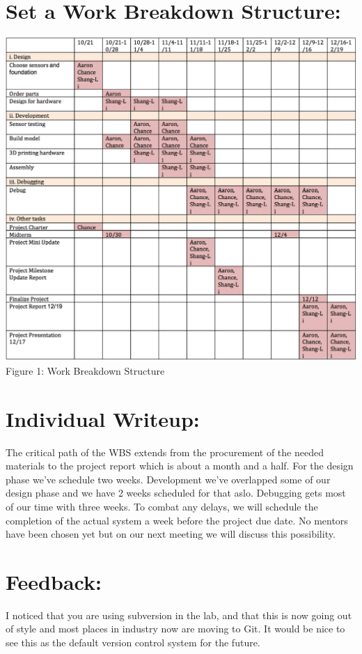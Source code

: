 \documentclass[twoside]{article}
\begin{document}
\section{Set a Work Breakdown Structure:}
\begin{center}
\includegraphics*[width = 19cm]{Fig2.png}\\
Figure 1: Work Breakdown Structure
\end{center}

\section{Individual Writeup:}

The critical path of the WBS extends from the procurement of the needed materials to the project report which is about a month and a half. For the design phase we've schedule two weeks. Development we've overlapped some of our design phase and we have 2 weeks scheduled for that aslo. Debugging gets most of our time with three weeks. To combat any delays, we will schedule the completion of the actual system a week before the project due date. No mentors have been chosen yet but on our next meeting we will discuss this possibility.

\section{Feedback:}
I noticed that you are using subversion in the lab, and that this is now going out of style and most places in industry now are moving to Git. It would be nice to see this as the default version control system for the future.
\end{document}

